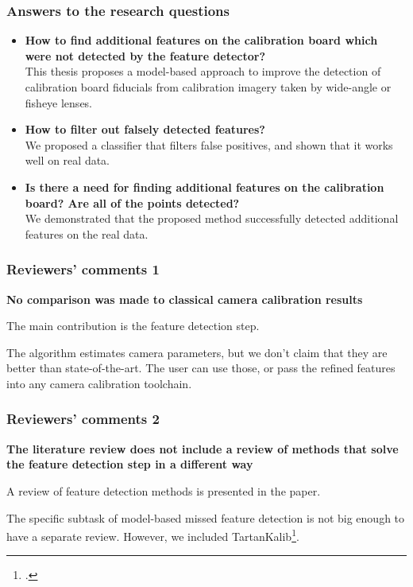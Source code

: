 \documentclass{beamer}
\begin{document}
\begin{frame}
	\frametitle{Answers to the research questions}

	\begin{itemize}
		\item \textbf{How to find additional features on the calibration board which were not
			      detected by the feature detector?}\\

		      This thesis proposes a model-based approach to improve the detection of
		      calibration board fiducials from calibration imagery taken by wide-angle or
		      fisheye lenses.
		\item \textbf{How to filter out falsely detected features?}\\

		      We proposed a classifier that filters false positives, and
		      shown that it works well on real data.
		\item \textbf{Is there a need for finding additional features on the calibration
			      board? Are all of the points detected?}\\

		      We demonstrated that the proposed method successfully detected
		      additional features on the real data.
	\end{itemize}
\end{frame}

\begin{frame}
	\frametitle{Reviewers' comments 1}
	\textbf{No comparison was made to classical camera calibration results}

	The main contribution is the feature detection step.

	The algorithm estimates camera parameters, but we don't claim that they are
	better than state-of-the-art. The user can use those, or pass the refined
	features into any camera calibration toolchain.
\end{frame}

\begin{frame}
	\frametitle{Reviewers' comments 2}
	\textbf{The literature review
		does not include a review of methods that solve the feature detection step in
		a different way}

	A review of feature detection methods is presented in the paper.

	The specific subtask of model-based missed
	feature detection is not big enough to have a separate review. However, we
	included TartanKalib\footcite{duisterhofTartanCalibIterativeWideAngle2022}.
\end{frame}
\end{document}

